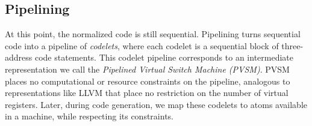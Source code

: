 
\subsection{Pipelining}
\label{ss:partitioning}

At this point, the normalized code is still sequential.  Pipelining turns
sequential code into a pipeline of \textit{codelets}, where each codelet is a
sequential block of three-address code statements. This codelet pipeline
corresponds to an intermediate representation we call the \textit{Pipelined
Virtual Switch Machine (PVSM)}. PVSM places no computational or resource
constraints on the pipeline, analogous to representations like LLVM that place
no restriction on the number of virtual registers. Later, during code
generation, we map these codelets to atoms available in a \absmachine machine,
while respecting its constraints.

